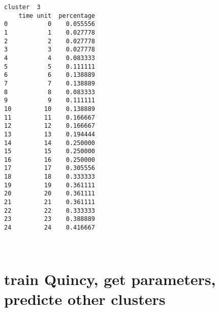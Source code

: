 \documentclass[11pt]{article}
\begin{document}
\begin{Verbatim}[commandchars=\\\{\}]
cluster  3
    time unit  percentage
0           0    0.055556
1           1    0.027778
2           2    0.027778
3           3    0.027778
4           4    0.083333
5           5    0.111111
6           6    0.138889
7           7    0.138889
8           8    0.083333
9           9    0.111111
10         10    0.138889
11         11    0.166667
12         12    0.166667
13         13    0.194444
14         14    0.250000
15         15    0.250000
16         16    0.250000
17         17    0.305556
18         18    0.333333
19         19    0.361111
20         20    0.361111
21         21    0.361111
22         22    0.333333
23         23    0.388889
24         24    0.416667

    \end{Verbatim}

    \begin{center}
    \end{center}
    { \hspace*{\fill} \\}
    
    \hypertarget{train-quincy-get-parameters-predicte-other-clusters}{%
\section{\texorpdfstring{\textbf{train Quincy, get parameters, predicte
other
clusters}}{train Quincy, get parameters, predicte other clusters}}\label{train-quincy-get-parameters-predicte-other-clusters}}
\end{document}
